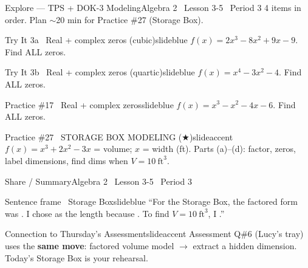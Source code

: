 \documentclass[aspectratio=169, 11pt]{beamer}
\begin{document}
\begin{frame}{Explore --- TPS + DOK-3 Modeling}{Algebra 2 \textperiodcentered\ Lesson 3-5 \textperiodcentered\ Period 3}
\small\textcolor{slidegray}{4 items in order. Plan \(\sim\)20 min for Practice \#27 (Storage Box).}

\vspace{0.15cm}
\begin{projcard}{Try It 3a \textperiodcentered\ Real + complex zeros (cubic)}{slideblue}
\(f(x) = 2x^3 - 8x^2 + 9x - 9\). Find ALL zeros.
\end{projcard}
\vspace{-0.15cm}
\begin{projcard}{Try It 3b \textperiodcentered\ Real + complex zeros (quartic)}{slideblue}
\(f(x) = x^4 - 3x^2 - 4\). Find ALL zeros.
\end{projcard}
\vspace{-0.15cm}
\begin{projcard}{Practice \#17 \textperiodcentered\ Real + complex zeros}{slideblue}
\(f(x) = x^3 - x^2 - 4x - 6\). Find ALL zeros.
\end{projcard}
\vspace{-0.15cm}
\begin{projcard}{Practice \#27 \textperiodcentered\ STORAGE BOX MODELING (\(\bigstar\))}{slideaccent}
\(f(x) = x^3 + 2x^2 - 3x\) = volume; \(x\) = width (ft). Parts (a)--(d): factor, zeros, label dimensions, find dims when \(V = 10\ \text{ft}^3\).
\end{projcard}
\end{frame}

\begin{frame}{Share / Summary}{Algebra 2 \textperiodcentered\ Lesson 3-5 \textperiodcentered\ Period 3}
\vspace{0.2cm}
\begin{projcard}{Sentence frame \textperiodcentered\ Storage Box}{slideblue}
``For the Storage Box, the factored form was \underline{\hspace{1.6cm}}.
I chose \underline{\hspace{1cm}} as the length because \underline{\hspace{1.8cm}}.
To find \(V = 10\ \text{ft}^3\), I \underline{\hspace{2.2cm}}.''
\end{projcard}

\vspace{0.15cm}
\begin{projcard}{Connection to Thursday's Assessment}{slideaccent}
Assessment Q\#6 (Lucy's tray) uses the \textbf{same move}: factored volume model \(\rightarrow\) extract a hidden dimension.\\
Today's Storage Box is your rehearsal.
\end{projcard}
\end{frame}
\end{document}
